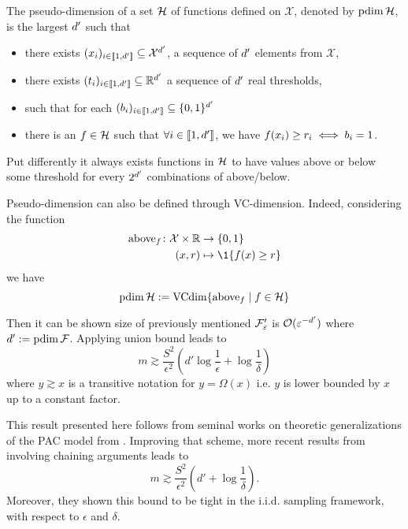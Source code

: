 \begin{tcolorbox}
	\begin{definition}
        \label{def__pseudodim}
		The pseudo-dimension of a set $\mathcal{H}$ of functions defined on $\mathcal{X}$, denoted by $\operatorname{pdim}\mathcal{H}$, is the largest ${d'}$ such that 
	\begin{itemize}
		\item there exists $(x_{i})_{i\in \llbracket 1,{d'} \rrbracket} \subseteq \mathcal{X}^{d'}$, a sequence of ${d'}$ elements from $\mathcal{X}$,
		\item there exists $(t_i)_{i\in \llbracket 1,{d'} \rrbracket} \subseteq  \mathbb{R}^{d'}$ a sequence of ${d'}$ real thresholds,
		\item such that for each $(b_i)_{i\in \llbracket 1,{d'} \rrbracket} \subseteq \{0,1\}^{d'}$
		\item there is an $f \in \mathcal{H}$ such that $\forall i \in \llbracket 1,{d'} \rrbracket$, we have $f(x_i) \geq r_i \iff b_i = 1$. 
	\end{itemize}
	Put differently it always exists functions in $\mathcal{H}$ to have values above or below some threshold for every $2^{d'}$ combinations of above/below.
\end{definition}
Pseudo-dimension can also be defined through VC-dimension. Indeed, considering the function
\begin{align*}
	\operatorname{above}_\query \colon \mathcal{X} \times \RR &\to \{0,1\}\\
	(x,r) &\mapsto \1\{f(x) \geq r\}
\end{align*}
we have
\begin{equation}
	\operatorname{pdim}\mathcal{H} := \operatorname{VCdim}\{\operatorname{above}_f \mid f \in \mathcal{H}\}
\end{equation}
\end{tcolorbox}

Then it can be shown size of previously mentioned $\mathcal{F}'_\varepsilon$ is $\mathcal{O}(\varepsilon^{-{d'}})$ where ${d'}:=\operatorname{pdim}\mathcal{F}$. Applying union bound leads to
\begin{equation*}
	m \gtrsim \frac{S^{2}}{\epsilon^{2}} (d'\log\frac{1}{\epsilon} + \log \frac{1}{\delta})
\end{equation*}
where $y \gtrsim x$ is a transitive notation for $y = \Omega(x)$ i.e. $y$ is lower bounded by $x$ up to a constant factor.

This result presented here follows from seminal works on theoretic generalizations of the PAC model from \cite{haussler1992decisiontheoricgeneralizationofPACmodel}.
Improving that scheme, more recent results from \cite{li2001_improved_bound_sample_complexity} involving chaining arguments leads to
\begin{equation*}
	m \gtrsim \frac{S^{2}}{\epsilon^{2}} (d' + \log \frac{1}{\delta}).
\end{equation*}
Moreover, they shown this bound to be tight in the i.i.d. sampling framework, with respect to $\epsilon$ and $\delta$.

